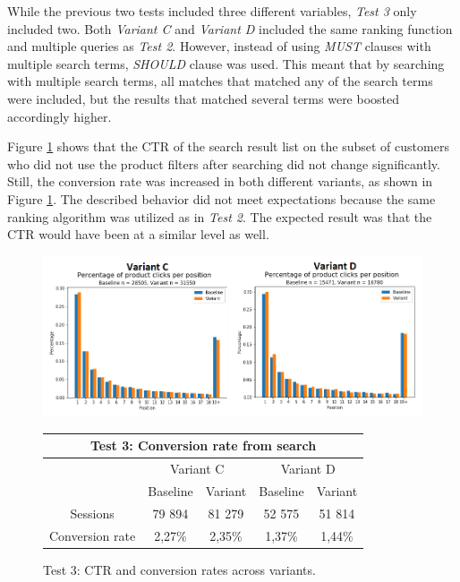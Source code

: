 

While the previous two tests included three different variables, \emph{Test 3} only included two.
Both \emph{Variant C} and \emph{Variant D} included the same ranking function and multiple queries as 
\emph{Test 2}.
However, instead of using \emph{MUST} clauses with multiple search terms, \emph{SHOULD} clause was used.
This meant that by searching with multiple search terms, all matches that matched any of 
the search terms were included, but the results that matched several terms were boosted accordingly higher.

Figure \ref{fig:search_v3} shows that the CTR of the search result list on the subset of customers who did not 
use the product filters after searching did not change significantly.
Still, the conversion rate was increased in both different variants, as shown in Figure \ref{fig:search_v3}.
The described behavior did not meet expectations because the same ranking algorithm was utilized as in \emph{Test 2}.
The expected result was that the CTR would have been at a similar level as well.


\begin{figure}
    \centering
    
    \includegraphics[width=\textwidth]{img/search_v3.png}

    \begin{tabular}{|c||c|c||c|c|}
    \hline
    \multicolumn{5}{|c|}{Test 3: Conversion rate from search} \\ \hline \hline
    & \multicolumn{2}{|c||}{Variant C} & \multicolumn{2}{|c|}{Variant D} \\ \cline{2-5}
    & Baseline & Variant & Baseline & Variant \\ \hline
    Sessions & 79 894 & 81 279 & 52 575 & 51 814 \\ \hline
    Conversion rate & 2,27\% & 2,35\% & 1,37\% & 1,44\% \\ \hline
    \end{tabular}
    \caption{Test 3: CTR and conversion rates across variants.}
    
    \label{fig:search_v3}
\end{figure}



